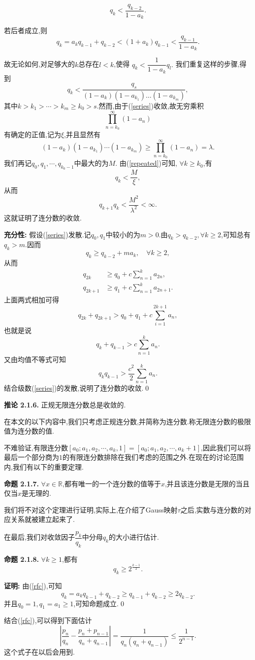 $$q_k<\frac{q_{k-2}}{1-a_k}.$$\par
若后者成立,则
$$q_k=a_kq_{k-1}+q_{k-2}<(1+a_k)q_{k-1}<\frac{q_{k-1}}{1-a_k}.$$\par
故无论如何,对足够大的$k$总存在$l<k$,使得
$q_k<\dfrac{1}{1-a_k}q_l.$
我们重复这样的步骤,得到
$$q_k<\frac{q_s}{\left(1-a_k\right)\left(1-a_{k_1}\right)\ldots\left(1-a_{k_m}\right)},$$
其中$k>k_1>\cdots>k_m\geqslant k_0>s$.然而,由于(\ref{series})收敛,故无穷乘积
$$\prod_{n=k_0}^{\infty}\left(1-a_n\right)$$
有确定的正值,记为$\xi$,并且显然有
\begin{equation}\label{repeated}
    (1-a_k)(1-a_{k_1})\cdots(1-a_{k_m})\geqslant \prod_{n=k_0}^{\infty}(1-a_n)=\lambda.
\end{equation}
我们再记$q_0,q_1,\cdots,q_{k_0-1}$中最大的为$M$.
由(\ref{repeated})可知, $\forall k\geqslant k_0$,有
$$q_k<\frac{M}{\xi},$$
从而
$$q_{k+1}q_k<\frac{M^2}{\lambda^2}<\infty.$$
这就证明了连分数的收敛.\par
\textbf{充分性: }假设(\ref{series})发散.记$q_0,q_1$中较小的为$m>0$.由$q_k>q_{k-2},\forall k\geqslant2$,可知总有$q_k>m$.因而
$$q_k\geqslant q_{k-2}+ma_k,\quad \forall k\geqslant 2,$$
从而
\begin{align*}
    q_{2k}   & \geqslant q_0+c\sum_{n=1}^k a_{2n},   \\
    q_{2k+1} & \geqslant q_1+c\sum_{n=1}^k a_{2n+1}.
\end{align*}
上面两式相加可得
$$q_{2k}+q_{2k+1}>q_{0}+q_{1}+c\sum_{i=1}^{2k+1}a_{n},$$
也就是说
$$q_k+q_{k-1}>c\sum\limits_{n=1}^k a_n.$$
又由均值不等式可知
$$q_{k}q_{k-1}>\frac{c^{2}}{2}\sum_{n=1}^{k}a_{n}.$$
结合级数(\ref{series})的发散,说明了连分数的收敛.\qed
\par
\textbf{推论 2.1.6.  }\textsuperscript{\cite{Khinchin}}
正规无限连分数总是收敛的.
\par
在本文的以下内容中,我们只考虑正规连分数,并简称为连分数.称无限连分数的极限值为连分数的值.\par
不难验证,有限连分数$[a_0;a_1,a_2,\cdots,a_k,1]=[a_0;a_1,a_2,\cdots,a_k+1]$,因此我们可以将最后一个部分商为$1$的有限连分数排除在我们考虑的范围之外.在现在的讨论范围内,我们有以下的重要定理.\par
\textbf{命题 2.1.7.  }\textsuperscript{\cite{Khinchin}}
$\forall x\in \mathbb{R}$,都有唯一的一个连分数的值等于$x$,并且该连分数是无限的当且仅当$x$是无理的.
\par
我们将不对这个定理进行证明,实际上,在介绍了Gauss映射$\tau$之后,实数与连分数的对应关系就被建立起来了.\par
在最后,我们对收敛因子$\dfrac{p_k}{q_k}$中分母$q_k$的大小进行估计.\par
\textbf{命题 2.1.8.  }\textsuperscript{\cite{Khinchin}}
$\forall k\geqslant 1$,都有
$$q_{k}\geqslant2^{\frac{k-1}{2}}.$$
\par
\textbf{证明:  }
由(\ref{rfc}),可知
$$q_k=a_k q_{k-1}+q_{k-2}\geqslant q_{k-1}+q_{k-2}\geqslant2q_{k-2}.$$
并且$q_0=1,q_1=a_1\geqslant 1$,可知命题成立.\qed
\par
结合(\ref{rfc}),可以得到下面估计
\begin{equation}\label{klength}
    \left|\frac{p_n}{q_n}-\frac{p_n+p_{n-1}}{q_n+q_{n-1}}\right|=\frac{1}{q_n(q_n+q_{n-1})}\leqslant\frac{1}{2^{n-1}}.
\end{equation}
这个式子在以后会用到.
